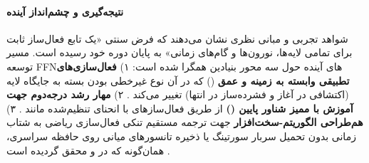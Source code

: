 \paragraph*{نتیجه‌گیری و چشم‌انداز آینده}
شواهد تجربی و مبانی نظری نشان می‌دهند که فرض سنتی «یک تابع فعال‌ساز ثابت برای تمامی لایه‌ها، نورون‌ها و گام‌های زمانی» به پایان دوره خود رسیده است. مسیر توسعه FFNهای آینده حول سه محور بنیادین همگرا شده است:
۱) \textbf{فعال‌سازی‌های تطبیقی وابسته به زمینه و عمق} () که در آن نوع غیرخطی بودن بسته به جایگاه لایه (اکتشافی در آغاز و فشرده‌ساز در انتها) تغییر می‌کند \cite{wang2026more, medeiros2026polyglu}.
۲) \textbf{مهار رشد درجه‌دوم جهت آموزش با ممیز شناور پایین ()} از طریق فعال‌ساز‌های با انحنای تنظیم‌شده مانند  \cite{jiang2026powlu}.
۳) \textbf{هم‌طراحی الگوریتم-سخت‌افزار} جهت ترجمه مستقیم تنکی فعال‌سازی ریاضی به شتاب زمانی بدون تحمیل سربار سورتینگ یا ذخیره تانسورهای میانی روی حافظه سراسری، همان‌گونه که در  و  محقق گردیده است \cite{you2025spark, zhang2025flashmhf}.